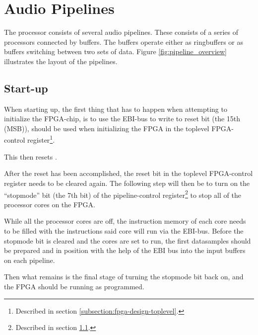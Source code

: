 \FloatBarrier
\section{Audio Pipelines}\label{sec:audio_pipelines}


The processor consists of several audio pipelines. These consists of
a series of processors connected by buffers. The buffers operate either
as ringbuffers or as buffers switching between two sets of data.
Figure \ref{fig:pipeline_overview} illustrates the
layout of the pipelines.

\subsection{Start-up}\label{subsection:fpga-pipeline-startup}


When starting up, the first thing that has to happen when attempting to
initialize the FPGA-chip, is to use the EBI-bus to write to reset bit (the 15th
(MSB)), should be used when initializing the FPGA in the toplevel
FPGA-control register\footnote{Described in section
\ref{subsection:fpga-design-toplevel}.}.

This then resets .

After the reset has been accomplished, the reset bit in the toplevel
FPGA-control register needs to be cleared again. The following step will then be
to turn on the ``stopmode'' bit (the 7th bit) of the pipeline-control
register\footnote{Described in section \ref{subsection:fpga-pipeline-startup}.}
to stop all of the processor cores on the FPGA.

While all the processor cores are off, the instruction memory of each core needs
to be filled with the instructions said core will run via the EBI-bus. Before
the stopmode bit is cleared and the cores are set to run, the first datasamples
should be prepared and in position with the help of the EBI bus into the input
buffers on each pipeline.

Then what remains is the final stage of turning the stopmode bit back on, and
the FPGA should be running as programmed.

